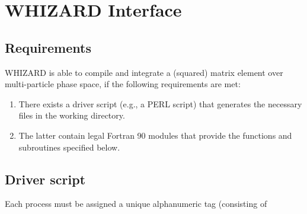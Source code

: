\documentclass[12pt]{article}
\begin{document}
\section*{WHIZARD Interface}
\subsection{Requirements}
WHIZARD is able to compile and integrate a (squared) matrix element
over multi-particle phase space, if the following requirements are
met:
\begin{enumerate}
\item There exists a driver script (e.g., a PERL script) that
generates the necessary files in the working directory.
\item The latter contain legal Fortran 90 modules that provide the
functions and subroutines specified below.
\end{enumerate}

\subsection{Driver script}
Each process must be assigned a unique alphanumeric tag (consisting of 
\end{document}
